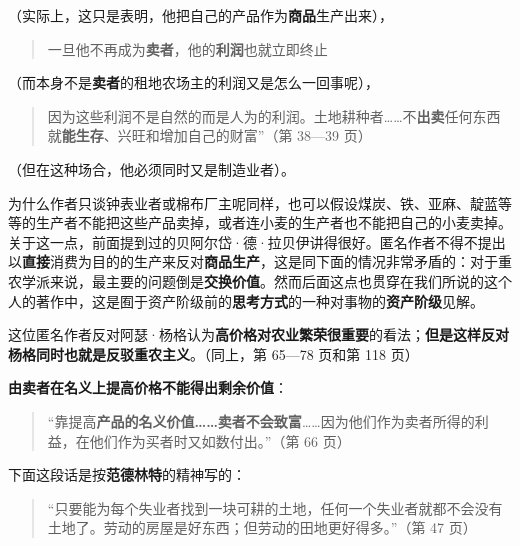 （实际上，这只是表明，他把自己的产品作为\textbf{商品}生产出来），

\begin{quote}一旦他不再成为\textbf{卖者}，他的\textbf{利润}也就立即终止\end{quote}

（而本身不是\textbf{卖者}的租地农场主的利润又是怎么一回事呢），

\begin{quote}因为这些利润不是自然的而是人为的利润。土地耕种者……不\textbf{出卖}任何东西就\textbf{能生存}、兴旺和增加自己的财富”（第 38—39 页）\end{quote}

（但在这种场合，他必须同时又是制造业者）。

为什么作者只谈钟表业者或棉布厂主呢同样，也可以假设煤炭、铁、亚麻、靛蓝等等的生产者不能把这些产品卖掉，或者连小麦的生产者也不能把自己的小麦卖掉。关于这一点，前面提到过的贝阿尔岱·德·拉贝伊讲得很好。匿名作者不得不提出以\textbf{直接}消费为目的的生产来反对\textbf{商品生产}，这是同下面的情况非常矛盾的：对于重农学派来说，最主要的问题倒是\textbf{交换价值}。然而后面这点也贯穿在我们所说的这个人的著作中，这是囿于资产阶级前的\textbf{思考方式}的一种对事物的\textbf{资产阶级}见解。

这位匿名作者反对阿瑟·杨格认为\textbf{高价格对农业繁荣很重要}的看法；\textbf{但是这样反对杨格同时也就是反驳重农主义}。（同上，第 65—78 页和第 118 页）

\textbf{由卖者在名义上提高价格不能得出剩余价值}：

\begin{quote}“靠提高\textbf{产品的名义价值……卖者不会致富}……因为他们作为卖者所得的利益，在他们作为买者时又如数付出。”（第 66 页）\end{quote}

下面这段话是按\textbf{范德林特}的精神写的：

\begin{quote}“只要能为每个失业者找到一块可耕的土地，任何一个失业者就都不会没有土地了。劳动的房屋是好东西；但劳动的田地更好得多。”（第 47 页）\end{quote}

